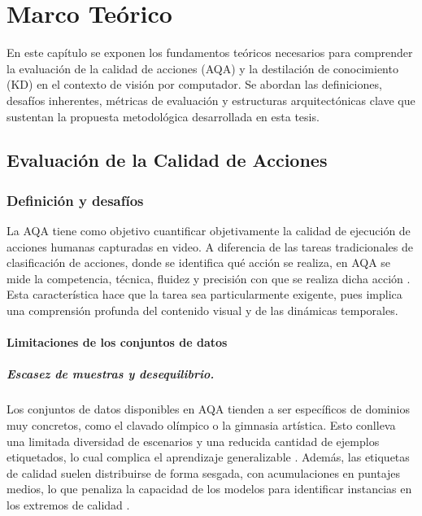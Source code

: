 








\chapter{Marco Teórico}\label{chap:background}

En este capítulo se exponen los fundamentos teóricos necesarios para comprender la evaluación de la calidad de acciones (\ac{AQA}) y la destilación de conocimiento (\ac{KD}) en el contexto de visión por computador. Se abordan las definiciones, desafíos inherentes, métricas de evaluación y estructuras arquitectónicas clave que sustentan la propuesta metodológica desarrollada en esta tesis.

\section{Evaluación de la Calidad de Acciones}

\subsection{Definición y desafíos}

La \ac{AQA} tiene como objetivo cuantificar objetivamente la calidad de ejecución de acciones humanas capturadas en video. A diferencia de las tareas tradicionales de clasificación de acciones, donde se identifica qué acción se realiza, en \ac{AQA} se mide la competencia, técnica, fluidez y precisión con que se realiza dicha acción \cite{Zhou2025Survey}. Esta característica hace que la tarea sea particularmente exigente, pues implica una comprensión profunda del contenido visual y de las dinámicas temporales.

\subsubsection{Limitaciones de los conjuntos de datos}

\paragraph{Escasez de muestras y desequilibrio.}
Los conjuntos de datos disponibles en AQA tienden a ser específicos de dominios muy concretos, como el clavado olímpico o la gimnasia artística. Esto conlleva una limitada diversidad de escenarios y una reducida cantidad de ejemplos etiquetados, lo cual complica el aprendizaje generalizable \cite{WangAQA2019}. Además, las etiquetas de calidad suelen distribuirse de forma sesgada, con acumulaciones en puntajes medios, lo que penaliza la capacidad de los modelos para identificar instancias en los extremos de calidad \cite{Wang2024Review}.

